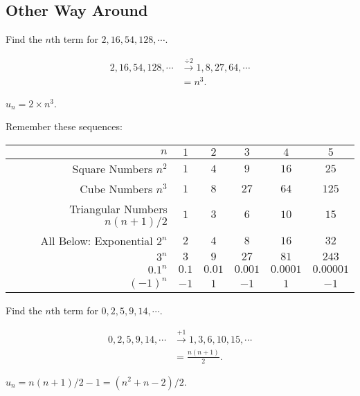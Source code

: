 \documentclass[8pt]{article}
\begin{document}
		\subsection{Other Way Around}

			\prob Find the \(n\)th term for \(2, 16, 54, 128, \cdots\).
			
			\solution 
			
			\begin{align*}
				2, 16, 54, 128, \cdots &\xrightarrow{\div 2} 1, 8, 27, 64, \cdots\\
				&= n^3.
			\end{align*}
			
			\(u_n = 2 \times n^3\).\newline

			\meth {} Remember these sequences:

			\begin{center}
				\begin{tabular}{r||c|c|c|c|c}
					\(n\) & \(1\) & \(2\) & \(3\) & \(4\) & \(5\)\\
					\hline
					Square Numbers \(n^2\) & \(1\) & \(4\) & \(9\) & \(16\) & \(25\)\\
					\hline
					Cube Numbers \(n^3\) & \(1\) & \(8\) & \(27\) & \(64\) & \(125\)\\
					\hline
					Triangular Numbers \(n(n+1)/2\) & \(1\) & \(3\) & \(6\) & \(10\) & \(15\)\\
					\hline
					All Below: Exponential \(2^n\) & \(2\) & \(4\) & \(8\) & \(16\) & \(32\)\\
					\hline
					\(3^n\) & \(3\) & \(9\) & \(27\) & \(81\) & \(243\)\\
					\hline
					\(0.1^n\) & \(0.1\) & \(0.01\) & \(0.001\) & \(0.0001\) & \(0.00001\)\\
					\hline
					\((-1)^n\) & \(-1\) & \(1\) & \(-1\) & \(1\) & \(-1\)
				\end{tabular}
			\end{center}

			\prob Find the \(n\)th term for \(0, 2, 5, 9, 14, \cdots\).
			
			\solution
			
			\begin{align*}
				0, 2, 5, 9, 14, \cdots &\xrightarrow{+1} 1, 3, 6, 10, 15, \cdots\\
				&= \frac{n(n+1)}{2}.
			\end{align*}
			
			\(u_n = n(n+1)/2-1 = (n^2 + n - 2)/2\).\newline
\end{document}
